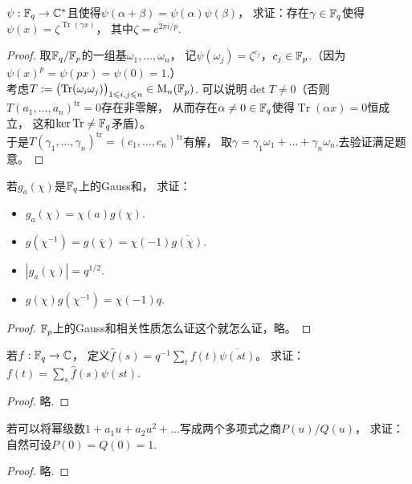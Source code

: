\begin{exercise}\label{7.9}
    $\psi:\mathbb{F}_q\to\mathbb{C}^*$且使得$\psi(\alpha+\beta)=\psi(\alpha)\psi(\beta)$，
    求证：存在$\gamma\in\mathbb{F}_q$使得$\psi(x)=\zeta^{\operatorname{Tr}(\gamma x)}$，
    其中$\zeta=e^{2\pi i/p}$.
\end{exercise}
\begin{proof}
    取$\mathbb{F}_q/\mathbb{F}_p$的一组基$\omega_1,\ldots,\omega_n$，
    记$\psi(\omega_j)=\zeta^{c_j}$，$c_j\in\mathbb{F}_p$.（因为$\psi(x)^p=\psi(px)=\psi(0)=1$.）\\
    考虑$T:=\bigl( \operatorname{Tr}(\omega_i\omega_j) \bigr)_{1\leqslant i,j\leqslant n}\in\operatorname{M}_n(\mathbb{F}_p)$.
    可以说明$\det T\neq0$（否则$T(a_1,\ldots,a_n)^{\operatorname{tr}}=0$存在非零解，
    从而存在$\alpha\neq0\in\mathbb{F}_q$使得$\operatorname{Tr}(\alpha x)=0$恒成立，
    这和$\ker\operatorname{Tr}\neq\mathbb{F}_q$矛盾）。\\
    于是$T(\gamma_1,\ldots,\gamma_n)^{\operatorname{tr}}=(c_1,\ldots,c_n)^{\operatorname{tr}}$有解，
    取$\gamma=\gamma_1\omega_1+\ldots+\gamma_n\omega_n$.去验证满足题意。
\end{proof}

\begin{exercise}\label{7.10}
   若$g_a(\chi)$是$\mathbb{F}_q$上的Gauss和，
   求证：
   \begin{itemize}
    \item[(1)] $g_a(\chi)=\chi(a)g(\chi)$.
    \item[(2)] $g(\chi^{-1})=g(\overline{\chi})=\chi(-1)\overline{g(\chi)}$.
    \item[(3)] $|g_a(\chi)|=q^{1/2}$.
    \item[(4)] $g(\chi)g(\chi^{-1})=\chi(-1)q$.
   \end{itemize}
\end{exercise}
\begin{proof}
    $\mathbb{F}_p$上的Gauss和相关性质怎么证这个就怎么证，略。
\end{proof}

\begin{exercise}\label{7.11}
    若$f:\mathbb{F}_q\to\mathbb{C}$，
    定义$\widehat{f}(s)=q^{-1}\sum_{t}f(t)\overline{\psi(st)}$。
    求证：$f(t)=\sum_{s}\widehat{f}(s)\psi(st)$.
\end{exercise}
\begin{proof}
    略.
\end{proof}

\begin{exercise}\label{7.12}
    若可以将幂级数$1+a_1u+a_2u^2+\ldots$写成两个多项式之商$P(u)/Q(u)$，
    求证：自然可设$P(0)=Q(0)=1$.
\end{exercise}
\begin{proof}
    略.
\end{proof}

